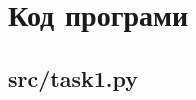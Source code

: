 \section{Код програми}
\label{sec:code}

\subsection{src/task1.py}
\label{subsec:src/task1.py}
\inputminted{python}{../src/task1.py}
